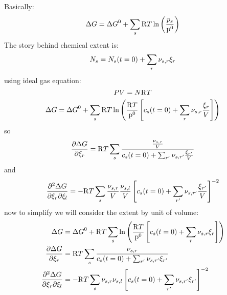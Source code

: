 Basically:
\begin{equation}
\Dgibbs = \DgibbsZ + \sum_s\Rg \Temp \ln\left(\frac{p_s}{\pz}\right)
\end{equation}
The story behind chemical extent is:
\begin{equation}
\Mol[s] = \Mol[s](t=0) + \sum_r \scoef[s,r] \ext[r]
\end{equation}
using ideal gas equation:
\begin{equation}
\Press \Vol = \Mol \Rg \Temp
\end{equation}
\begin{equation}
\Dgibbs = \DgibbsZ + \sum_s\Rg \Temp \ln\left(\frac{\Rg \Temp}{\pz}
                                                \left[\conc_s(t=0) +
                                                           \sum_r\scoef[s,r]\frac{\ext[r]}{\Vol}
                                                \right]
                                        \right)
\end{equation}
so
\begin{equation}
\doverdext[r]{\Dgibbs} = \Rg\Temp \sum_s\frac{\frac{\scoef[s,r]}{\Vol}}
                                             {\conc_s(t=0) + \sum_{r'} \scoef[s,r']\frac{\ext[r']}{\Vol}}
\end{equation}
and
\begin{equation}
\ddoverddext{\Dgibbs}{r}{l} = -\Rg\Temp \sum_s\frac{\scoef[s,r]}{\Vol}\frac{\scoef[s,l]}{\Vol}
                                        \left[\conc_s(t=0) + \sum_{r'}\scoef[s,r']\frac{\ext[r']}{\Vol}\right]^{-2}
\end{equation}
now to simplify we will consider the extent by unit of volume:
\begin{equation}
\begin{split}
\Dgibbs & =  \DgibbsZ + \Rg\Temp \sum_s \ln\left(\frac{\Rg\Temp}{\pz}\left[\conc_s(t=0) + \sum_r\scoef[s,r]\ext[r]\right]\right) \\
\doverdext[r]{\Dgibbs} & = \Rg\Temp \sum_s\frac{\scoef[s,r]}{\conc_s(t=0) + \sum_{r'} \scoef[s,r']\ext[r']} \\
\ddoverddext{\Dgibbs}{r}{l} & =  -\Rg\Temp \sum_s\scoef[s,r]\scoef[s,l]\left[\conc_s(t=0) + \sum_{r'}\scoef[s,r']\ext[r']\right]^{-2}
\end{split}
\end{equation}
